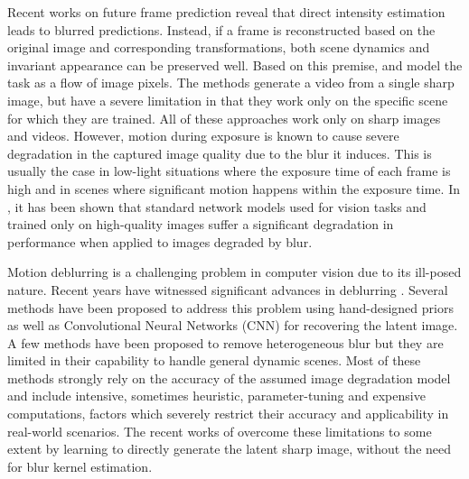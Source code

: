 \documentclass[10pt,twocolumn,letterpaper]{article}
\begin{document}
Recent works on future frame prediction reveal that direct intensity estimation leads to blurred predictions. Instead, if a frame is reconstructed based on the original image and corresponding transformations, both scene dynamics and invariant appearance can be preserved well. Based on this premise, \cite{flynn2016deepstereo,zhou2016view} and \cite{liu2017video} model the task as a flow of image pixels. The methods \cite{vondrick2016generating,xue2016visual} generate a video from a single sharp image, but have a severe limitation in that they work only on the specific scene for which they are trained. All of these approaches work only on sharp images and videos. However, motion during exposure is known to cause severe degradation in the captured image quality due to the blur it induces. This is usually the case in low-light situations where the exposure time of each frame is high and in scenes where significant motion happens within the exposure time. In \cite{vasiljevic2016examining}, it has been shown that standard network models used for vision tasks and trained only on high-quality images suffer a significant degradation in performance when applied to images degraded by blur.

Motion deblurring is a challenging problem in computer vision due to its ill-posed nature. Recent years have witnessed significant advances in deblurring \cite{vasu2017local,pan2016blind,pan2014deblurring}. Several methods \cite{xu2010two,pan2016robust,fergus2006removing,shan2008high,cho2009fast,joshi2008psf,krishnan2009fast,krishnan2011blind,xu2010two} have been proposed to address this problem using hand-designed priors as well as Convolutional Neural Networks (CNN)  \cite{chakrabarti2016neural,schuler2013machine,schuler2016learning}  for recovering the latent image. A few methods \cite{sun2015learning,gong2017motion} have been proposed to remove heterogeneous blur but they are limited in their capability to handle general dynamic scenes. Most of these methods strongly rely on the accuracy of the assumed image degradation model and include intensive, sometimes heuristic, parameter-tuning and expensive computations, factors which severely restrict their accuracy and applicability in real-world scenarios. The recent works of \cite{nah2017deep,nimisha2017blur,kupyn2017deblurgan,tao2018scale} overcome these limitations to some extent by learning to directly generate the latent sharp image, without the need for blur kernel estimation. 
\end{document}
